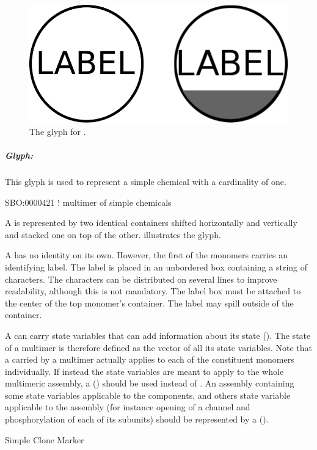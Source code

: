 \begin{figure}[H]
  \centering
  \includegraphics[scale = 0.3]{images/simpleChemical}
  \caption{The \PD glyph for .}
  \label{fig:simpleChemical}
\end{figure}

\subparagraph{Glyph: }

This glyph is used to represent a simple chemical with a cardinality
of one.

\begin{glyphDescription}

\glyphSboTerm SBO:0000421 ! multimer of simple chemicals

\glyphContainer A  is represented by two identical containers shifted horizontally and vertically and stacked one on top of the other.   illustrates the glyph.

\glyphLabel A  has no identity on its own.  However, the first of the monomers carries an identifying label.  The label is placed in an unbordered box containing a string of characters.  The characters can be distributed on several lines to improve readability, although this is not mandatory.  The label box must be attached to the center of the top monomer's container.  The label may spill outside of the container.

\glyphAux A  can carry state variables that can add information about its state ().  The state of a multimer is therefore defined as the vector of all its state variables.  Note that a  carried by a multimer actually applies to each of the constituent monomers individually.  If instead the state variables are meant to apply to the whole multimeric assembly, a  () should be used instead of .  An assembly containing some state variables applicable to the components, and others state variable applicable to the assembly (for instance opening of a channel and phosphorylation of each of its subunits) should be represented by a  ().

\glyphCloning Simple Clone Marker

\end{glyphDescription}

